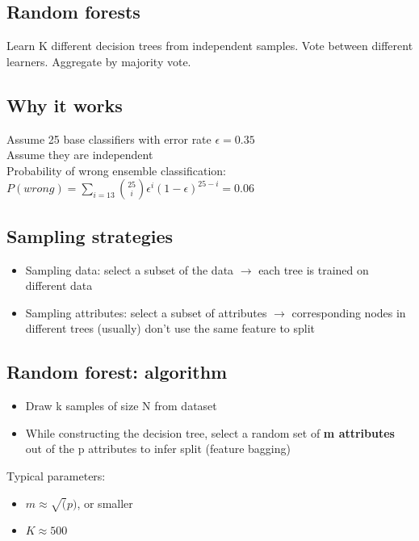 \subsection{Random forests}
Learn K different decision trees from independent samples. Vote
between different learners. Aggregate by majority vote.

\subsection{Why it works}
Assume 25 base classifiers with error rate $ \epsilon = 0.35 $ \\
Assume they are independent \\
Probability of wrong ensemble classification: \\
$ P(wrong) = \sum_{i=13} \binom{25}{i} \epsilon^i (1 - \epsilon)^{25 -
i} = 0.06 $

\subsection{Sampling strategies}

\begin{itemize}
\item Sampling data: select a subset of the data $ \rightarrow $ each
  tree is trained on different data
\item Sampling attributes: select a subset of attributes $ \rightarrow
  $ corresponding nodes in different trees (usually) don't use the
  same feature to split
\end{itemize}

\subsection{Random forest: algorithm}
\begin{itemize}
\item Draw k samples of size N from dataset
\item While constructing the decision tree, select a random set of
  \textbf{m attributes} out of the p attributes to infer split
  (feature bagging)
\end{itemize}
Typical parameters:
\begin{itemize}
\item $ m \approx \sqrt(p) $, or smaller
\item $ K \approx 500 $
\end{itemize}

